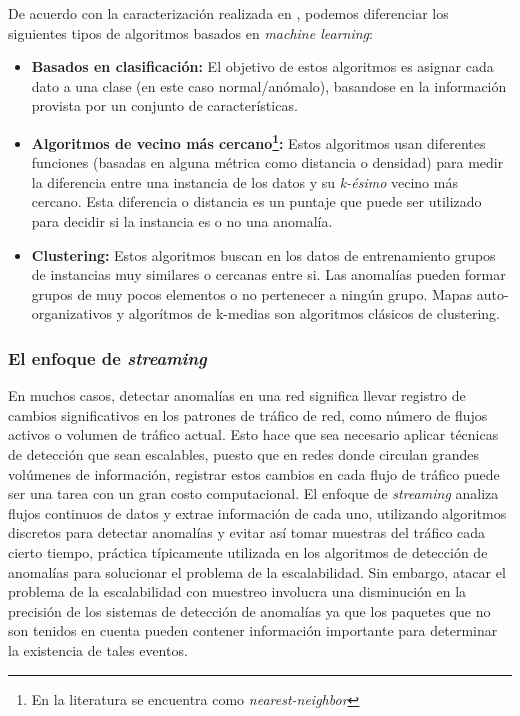\documentclass[a4paper,10pt, oneside]{article}
\begin{document}
De acuerdo con la caracterización realizada en \cite{Chandola:2009:ADS:1541880.1541882}, podemos diferenciar los siguientes tipos de algoritmos basados en \textit{machine learning}:
\begin{itemize}
	\item \textbf{Basados en clasificación:} El objetivo de estos algoritmos es asignar cada dato a una clase (en este caso normal/anómalo), basandose en la información provista por un conjunto de características.
	\item \textbf{Algoritmos de vecino más cercano\footnote{En la literatura se encuentra como \textit{nearest-neighbor}}:} Estos algoritmos usan diferentes funciones (basadas en alguna métrica como distancia o densidad) para medir la diferencia entre una instancia de los datos y su \textit{k-ésimo} vecino más cercano\cite{Chandola:2009:ADS:1541880.1541882}. Esta diferencia o distancia es un puntaje que puede ser utilizado para decidir si la instancia es o no una anomalía.
	\item \textbf{Clustering:} Estos algoritmos buscan en los datos de entrenamiento grupos de instancias muy similares o cercanas entre si. Las anomalías pueden formar grupos de muy pocos elementos o no pertenecer a ningún grupo. Mapas auto-organizativos\cite{Kohonen:1997:SM:261082} y algorítmos de k-medias\cite{Hartigan/Wong:79} son algoritmos clásicos de clustering.
\end{itemize}

\subsubsection{El enfoque de \textit{streaming}}
En muchos casos, detectar anomalías en una red significa llevar registro de cambios significativos en los patrones de tráfico de red, como número de flujos activos o volumen de tráfico actual. Esto hace que sea necesario aplicar técnicas de detección que sean escalables, puesto que en redes donde circulan grandes volúmenes de información, registrar estos cambios en cada flujo de tráfico puede ser una tarea con un gran costo computacional.
El enfoque de \textit{streaming} analiza flujos continuos de datos y extrae información de cada uno, utilizando algoritmos discretos para detectar anomalías\cite{Cormode:2010:ANG:1805876} y evitar así tomar muestras del tráfico cada cierto tiempo, práctica típicamente utilizada en los algoritmos de detección de anomalías para solucionar el problema de la escalabilidad. Sin embargo, atacar el problema de la escalabilidad con muestreo involucra una disminución en la precisión de los sistemas de detección de anomalías ya que los paquetes que no son tenidos en cuenta pueden contener información importante para determinar la existencia de tales eventos.
\end{document}

